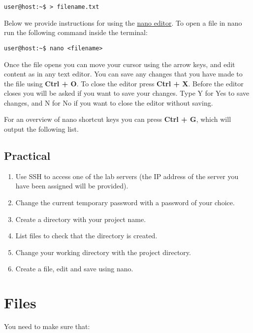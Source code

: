 \documentclass[
]{book}
\begin{document}
\begin{verbatim}
user@host:~$ > filename.txt
\end{verbatim}

Below we provide instructions for using the
\href{https://www.nano-editor.org/}{nano editor}. To open a file in nano run the following command inside the
terminal:

\begin{verbatim}
user@host:~$ nano <filename>
\end{verbatim}

Once the file opens you can move your cursor using the arrow keys, and edit content
as in any text editor. You can save any changes that you have made to the file
using \textbf{Ctrl + O}. To close the editor press \textbf{Ctrl + X}. Before the editor
closes you will be asked if you want to save your changes. Type Y for Yes to
save changes, and N for No if you want to close the editor without saving.

For an overview of nano shortcut keys you can press \textbf{Ctrl + G}, which will output the following list.

\hypertarget{practical}{%
\section{Practical}\label{practical}}

\begin{enumerate}
\def\labelenumi{\arabic{enumi})}
\item
  Use SSH to access one of the lab servers (the IP address of the server you have been assigned will be provided).
\item
  Change the current temporary password with a password of your choice.
\item
  Create a directory with your project name.
\item
  List files to check that the directory is created.
\item
  Change your working directory with the project directory.
\item
  Create a file, edit and save using nano.
\end{enumerate}

\hypertarget{files}{%
\chapter{Files}\label{files}}

You need to make sure that:
\end{document}
